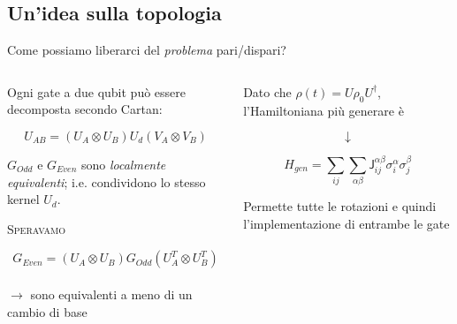 \documentclass[xcolor=x11names,compress]{beamer}
\renewcommand{\(}{\begin{columns}}
\renewcommand{\)}{\end{columns}}
\newcommand{\<}[1]{\begin{column}{#1}}
\renewcommand{\>}{\end{column}}
\begin{document}
\subsection{Un'idea sulla topologia}
\begin{frame}{Come possiamo liberarci del \emph{problema} pari/dispari?}

\begin{columns}[c]

\hspace{20pt}



\begin{column}{0.5\textwidth}

\vspace{-.5cm}

\scriptsize{
Ogni gate a due qubit può essere decomposta secondo Cartan:

$$U_{AB} = (U_A \otimes U_B) U_{d} (V_A \otimes V_B) $$

$G_{Odd}$ e $G_{Even}$ sono \emph{localmente equivalenti}; i.e. condividono lo stesso kernel $U_d$.}

\vspace{.7cm}

\begin{block}{\textcolor{mygreen}{\textsc{Speravamo}}}

\vspace{-0.5cm}

\scriptsize{ $$G_{Even} = (U_A \otimes U_B) G_{Odd} (U^T_A \otimes U^T_B) $$\\
$\rightarrow$ sono equivalenti a meno di un cambio di base}
\end{block}


\end{column}

\hspace{10pt}

\begin{column}{0.5\textwidth}

\scriptsize{Dato che $\rho (t) = U \rho_0 U^{\dag}$, l'Hamiltoniana più generare è}

\tiny{

$$\downarrow$$

\vspace{-0.4cm}

$$H_{gen} = \sum_{ij} \sum_{\alpha \beta} \textsf{J}^{\alpha \beta}_{ij} \sigma_i^{\alpha} \sigma_{j}^{\beta}$$
}

\scriptsize{Permette tutte le rotazioni e quindi l'implementazione di entrambe le gate}


\end{column}
\end{columns}
\end{frame}
\end{document}
